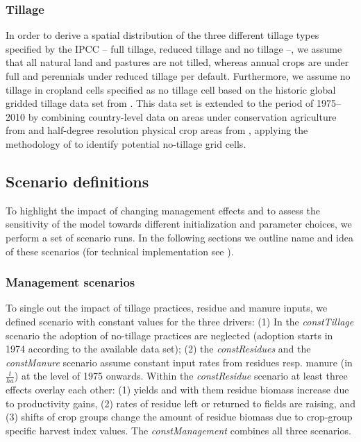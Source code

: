 \documentclass[gc, manuscript]{copernicus}
\begin{document}
\hypertarget{sec:tillage}{%
\subsubsection{Tillage}\label{sec:tillage}}

In order to derive a spatial distribution of the three different tillage types specified by the IPCC -- full tillage, reduced tillage and no tillage --, we assume that all natural land and pastures are not tilled, whereas annual crops are under full and perennials under reduced tillage per default. Furthermore, we assume no tillage in cropland cells specified as no tillage cell based on the historic global gridded tillage data set from \citep{porwollik_generating_2018}. This data set is extended to the period of 1975--2010 by combining country-level data on areas under conservation agriculture from \citep{fao_aquastat_2016} and half-degree resolution physical crop areas from \citep{hurtt_harmonization_2020}, applying the methodology of \citep{porwollik_generating_2018} to identify potential no-tillage grid cells.

\hypertarget{sec:scenarios}{%
\subsection{Scenario definitions}\label{sec:scenarios}}

To highlight the impact of changing management effects and to assess the sensitivity of the model towards different initialization and parameter choices, we perform a set of scenario runs. In the following sections we outline name and idea of these scenarios (for technical implementation see \citep{karstens_mrsoil_2020}).

\hypertarget{sec:scen_management}{%
\subsubsection{Management scenarios}\label{sec:scen_management}}

To single out the impact of tillage practices, residue and manure inputs, we defined scenario with constant values for the three drivers: (1) In the \textit{constTillage} scenario the adoption of no-tillage practices are neglected (adoption starts in 1974 according to the available data set); (2) the \textit{constResidues} and the \textit{constManure} scenario assume constant input rates from residues resp. manure (in \(\tfrac{t}{ha}\)) at the level of 1975 onwards. Within the \textit{constResidue} scenario at least three effects overlay each other: (1) yields and with them residue biomass increase due to productivity gains, (2) rates of residue left or returned to fields are raising, and (3) shifts of crop groups change the amount of residue biomass due to crop-group specific harvest index values. The \textit{constManagement} combines all three scenarios.
\end{document}
